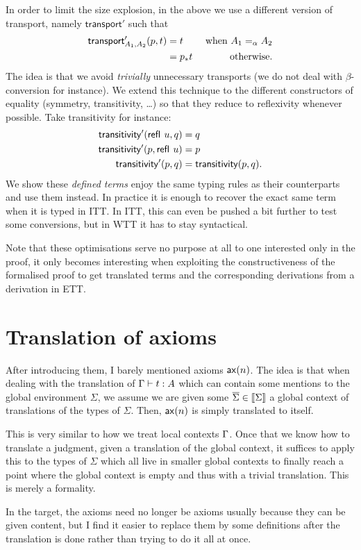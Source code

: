 In order to limit the size explosion, in the above we use a different version of
transport, namely $\mathsf{transport}'$ such that
%
\begin{align*}
  \mathsf{transport}'_{A_1,A_2}(p,t) &= t &\text{ when } A_1 =_\alpha A_2 \\
  &= p_*{t} &\text{ otherwise.}
\end{align*}
%
The idea is that we avoid \emph{trivially} unnecessary transports (we do not
deal with $\beta$-conversion for instance).
We extend this technique to the different constructors of equality (symmetry,
transitivity, \dots) so that they reduce to reflexivity whenever possible.
Take transitivity for instance:
%
\begin{align*}
  \mathsf{transitivity}'({\mathsf{refl}}_{}\  u,q) &= q \\
  \mathsf{transitivity}'(p,{\mathsf{refl}}_{}\  u) &= p \\
  \mathsf{transitivity}'(p,q) &= \mathsf{transitivity}(p,q).
\end{align*}
%
We show these \emph{defined terms} enjoy the same typing rules as their
counterparts and use them instead.
In practice it is enough to recover the exact same term when it is typed in
\acrshort{ITT}.
In \acrshort{ITT}, this can even be pushed a bit further to test some
conversions, but in \acrshort{WTT} it has to stay syntactical.

Note that these optimisations serve no purpose at all to one interested only in
the proof, it only becomes interesting when exploiting the constructiveness of
the formalised proof to get translated terms and the corresponding derivations
from a derivation in \acrshort{ETT}.

\section{Translation of axioms}

After introducing them, I barely mentioned axioms \(\mathsf{ax}(n)\).
The idea is that when dealing with the translation of \(\Gamma \vdash t : A\)
which can contain some mentions to the global environment \(\Sigma\),
we assume we are given some \(\overline{\Sigma} \in \llbracket \Sigma \rrbracket\)
a global context of translations of the types of \(\Sigma\).
Then, \(\mathsf{ax}(n)\) is simply translated to itself.

This is very similar to how we treat local contexts \(\Gamma\).
Once that we know how to translate a judgment, given a translation of the
global context, it suffices to apply this to the types of \(\Sigma\) which all
live in smaller global contexts to finally reach a point where the global
context is empty and thus with a trivial translation.
This is merely a formality.

In the target, the axioms need no longer be axioms usually because they can be
given content, but I find it easier to replace them by some definitions after
the translation is done rather than trying to do it all at once.